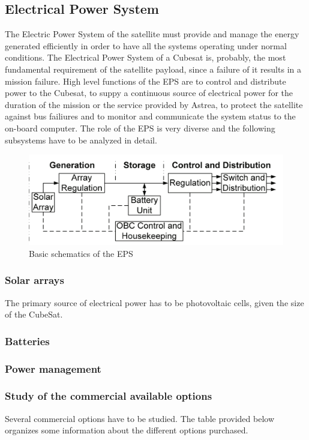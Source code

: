\subsection{Electrical Power System}

The Electric Power System of the satellite must provide and manage the energy generated efficiently in order to have all the systems operating under normal conditions. The Electrical Power System of a Cubesat is, probably, the most fundamental requirement of the satellite payload, since a failure of it results in a mission failure. High level functions of the EPS are to control and distribute power to the Cubesat, to suppy a continuous source of electrical power for the duration of the mission or the service provided by Astrea, to protect the satellite against bus failiures and to monitor and communicate the system status to the on-board computer. The role of the EPS is very diverse and the following subsystems have to be analyzed in detail.

\begin{figure}[h]
\includegraphics[scale=0.6]{./sections/SatelliteDesign/images/EPSschematics}
\centering
\caption{Basic schematics of the EPS \cite{epsbasics}}
\end{figure}

\subsubsection{Solar arrays}
The primary source of electrical power has to be photovoltaic cells, given the size of the CubeSat. 
\subsubsection{Batteries}
\subsubsection{Power management}

\subsubsection{Study of the commercial available options}
Several commercial options have to be studied. The table provided below organizes some information about the different options purchased.

